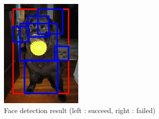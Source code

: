 \documentclass[conference,compsoc]{IEEEtran}
\begin{document}
\begin{figure}
\begin{multicols}{4}
    		\includegraphics[height=1.35\linewidth]{smolrect2.jpg}\par
	\end{multicols}
	\caption{Face detection result (left : succeed, right : failed)}
\end{figure}
\end{document}
